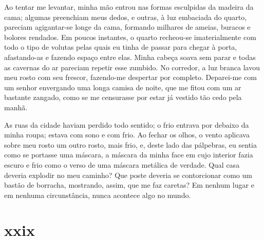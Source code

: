 Ao tentar me levantar, minha mão entrou nas formas esculpidas da madeira da
cama; algumas preenchiam meus dedos, e outras, à luz embaciada do quarto,
pareciam agigantar-se longe da cama, formando milhares de ameias, buracos e
bolores rendados. Em poucos instantes, o quarto recheou-se imaterialmente com
todo o tipo de volutas pelas quais eu tinha de passar para chegar à porta,
afastando-as e fazendo espaço entre elas. Minha cabeça soava sem parar e
todas as cavernas do ar pareciam repetir esse zumbido. No corredor, a luz
branca lavou meu rosto com seu frescor, fazendo-me despertar por completo.
Deparei-me com um senhor envergando uma longa camisa de noite, que me fitou
com um ar bastante zangado, como se me censurasse por estar já vestido tão
cedo pela manhã.


As ruas da cidade haviam perdido todo sentido; o frio entrava por debaixo da
minha roupa; estava com sono e com frio. Ao fechar os olhos, o vento aplicava
sobre meu rosto um outro rosto, mais frio, e, deste lado das pálpebras, eu
sentia como se portasse uma máscara, a máscara da minha face em cujo interior
fazia escuro e frio como o verso de uma máscara metálica de verdade. Qual
casa deveria explodir no meu caminho? Que poste deveria se contorcionar como
um bastão de borracha, mostrando, assim, que me faz caretas? Em nenhum lugar
e em nenhuma circunstância, nunca acontece algo no mundo.


\section{xxix} 

 

